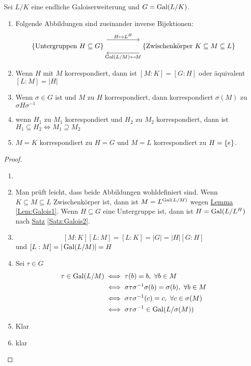 \begin{Satz}[Galoiskorrespondenz]
Sei $L/K$ eine endliche Galoiserweiterung und $G=\operatorname{Gal}(L/K)$.
\begin{enumerate}
    \item Folgende Abbildungen sind zueinander inverse Bijektionen:
$$%
\begin{tikzcd}
\Set{\text{Untergruppen $H\subseteq G$}} \arrow[rr, "H\mapsto L^H", shift left=4] &  & \Set{\text{Zwischenkörper $K\subseteq M\subseteq L$}} \arrow[ll, "\Gal(L/M)\mapsfrom M", shift left=4]
\end{tikzcd}$$
\item Wenn $H$ mit $M$ korrespondiert, dann ist $[M:K]=[G:H]$ oder äquivalent $[L:M]=|H|$
\item Wenn $\sigma\in G$ ist und $M$ zu $H$ korrespondiert, dann korrespondiert $\sigma(M)$ zu $\sigma H\sigma^{-1}$
\item wenn $H_1$ zu $M_1$ korrespondiert und $H_2$ zu $M_2$ korrespondiert, dann ist $H_1\subseteq H_2\iff M_1\supseteq M_2$
\item $M=K$ korrespondiert zu $H=G$ und $M=L$ korrespondiert zu $H=\{e\}$.
\end{enumerate}
\begin{proof}
    \begin{enumerate}
        \item[] 
        \item Man prüft leicht, dass beide Abbildungen wohldefiniert sind.
        Wenn $K\subseteq M\subseteq L$ Zwischenkörper ist, dann ist $M=L^{\operatorname{Gal}(L/M)}$ wegen \hyperref[Lem:Galois1]{Lemma} \ref{Lem:Galois1}.
        Wenn $H\subseteq G$ eine Untergruppe ist, dann ist $H=\operatorname{Gal}(L/L^H)$ nach \hyperref[Satz:Galois2]{Satz} \ref{Satz:Galois2}.
        \item $$[M:K][L:M]=[L:K]=|G|=|H|[G:H]$$ und $[L:M]=|\operatorname{Gal}(L/M)|=H$
        \item Sei $\tau\in G$
        \begin{align*}
            \tau\in \operatorname{Gal}(L/M)&\iff \tau(b)=b,\ \forall b\in M\\
            &\iff \sigma \tau\sigma^{-1}\sigma(b)=\sigma(b),\ \forall b\in M\\
            &\iff \sigma\tau\sigma^{-1}(c)=c,\ \forall c\in \sigma(M)\\
            & \iff \sigma\tau\sigma^{-1}\in\operatorname{Gal}(L/\sigma(M))
        \end{align*}
        \item Klar
        \item klar
    \end{enumerate}
\end{proof}

\end{Satz}
